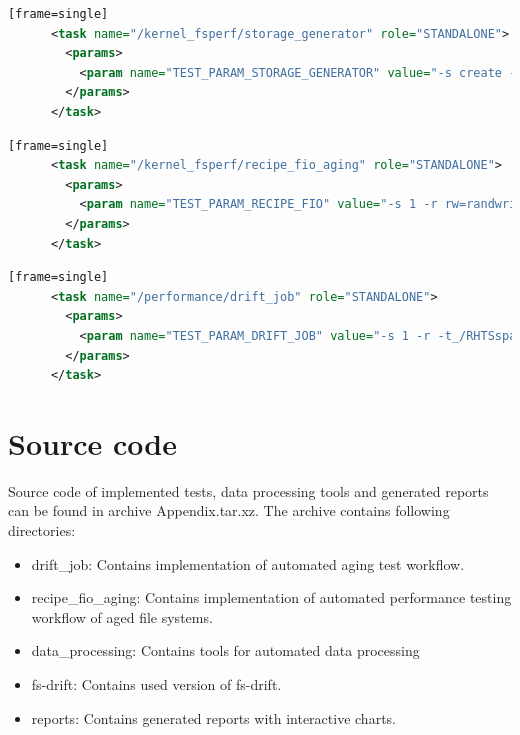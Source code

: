 \documentclass[
  color, %
  table, %
  lof,   %
  lot,   %
]{fithesis3}
\begin{document}
\begin{lstlisting}[language=xml, caption={Configuring single device and file system ext4 using storage generator},label={ex:storage_generator}][frame=single]
      <task name="/kernel_fsperf/storage_generator" role="STANDALONE">
        <params>
          <param name="TEST_PARAM_STORAGE_GENERATOR" value="-s create -f ext4 -t single -m /RHTSspareLUN1 -d /dev/sdc -T 1SASHDD_ext4"/>
        </params>
      </task>
\end{lstlisting}
\begin{lstlisting}[language=xml, caption={Scheduling performance test of aged file system in Beaker environment},label={ex:fio}][frame=single]
      <task name="/kernel_fsperf/recipe_fio_aging" role="STANDALONE">
        <params>
          <param name="TEST_PARAM_RECIPE_FIO" value="-s 1 -r rw=randwrite-bs=4k-runtime=10m-fsync=64-direct=1-ioengine=libaio-thread-group_reporting-numjobs=10-size=1g-time_based-nrfiles=2441-openfiles=100-create_on_open=1 -D /dev/sdb1 -f ext4 -d 0 -t 1SATASSD -q W495TRIM -n 3"/>
        </params>
      </task>
\end{lstlisting}
\clearpage
\begin{lstlisting}[language=xml, caption={Scheduling file system aging task in Beaker environment},label={ex:age}][frame=single]
      <task name="/performance/drift_job" role="STANDALONE">
        <params>
          <param name="TEST_PARAM_DRIFT_JOB" value="-s 1 -r -t_/RHTSspareLUN1-o_12000000-f_4000000-+v_10000-w_wtable4.csv-i_300-+D_gaussian-T_on-Y_50-N_on -d /dev/sdb1 -M /RHTSspareLUN1 -t 1SASHDD -q W4595 -m 5_99 -f 0"/>
        </params>
      </task>
\end{lstlisting}

\chapter{Source code}
\label{source}
Source code of implemented tests, data processing tools and generated reports can be found in archive Appendix.tar.xz. The archive contains following directories:

\begin{itemize}
\itemsep0em 
   \item drift\_job: Contains implementation of automated aging test workflow.
   \item recipe\_fio\_aging: Contains implementation of automated performance testing workflow of aged file systems.
   \item data\_processing: Contains tools for automated data processing
   \item fs-drift: Contains used version of fs-drift.
   \item reports: Contains generated reports with interactive charts.
\end{itemize}
\end{document}
